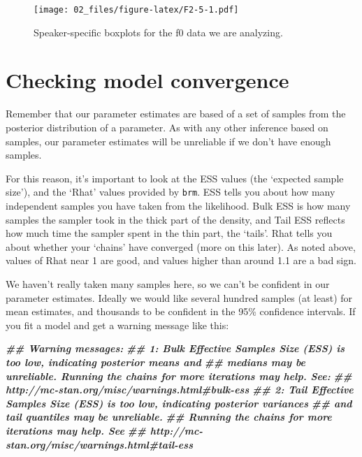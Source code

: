 \documentclass[
]{book}
\newenvironment{Shaded}{\begin{snugshade}}{\end{snugshade}}
\newcommand{\DocumentationTok}[1]{\textcolor[rgb]{0.56,0.35,0.01}{\textbf{\textit{#1}}}}
\begin{document}
\begin{figure}
\centering
\texttt{[image: 02\_files/figure-latex/F2-5-1.pdf]}
\caption{\label{fig:F2-5}Speaker-specific boxplots for the f0 data we are analyzing.}
\end{figure}

\hypertarget{checking-model-convergence}{%
\section{Checking model convergence}\label{checking-model-convergence}}

Remember that our parameter estimates are based of a set of samples from the posterior distribution of a parameter. As with any other inference based on samples, our parameter estimates will be unreliable if we don't have enough samples.

For this reason, it's important to look at the ESS values (the `expected sample size'), and the `Rhat' values provided by \texttt{brm}. ESS tells you about how many independent samples you have taken from the likelihood. Bulk ESS is how many samples the sampler took in the thick part of the density, and Tail ESS reflects how much time the sampler spent in the thin part, the `tails'. Rhat tells you about whether your `chains' have converged (more on this later). As noted above, values of Rhat near 1 are good, and values higher than around 1.1 are a bad sign.

We haven't really taken many samples here, so we can't be confident in our parameter estimates. Ideally we would like several hundred samples (at least) for mean estimates, and thousands to be confident in the 95\% confidence intervals. If you fit a model and get a warning message like this:

\begin{Shaded}
\begin{Highlighting}[]
\DocumentationTok{\#\# Warning messages:}
\DocumentationTok{\#\# 1: Bulk Effective Samples Size (ESS) is too low, indicating posterior means and  }
\DocumentationTok{\#\# medians may be unreliable. Running the chains for more iterations may help. See:}
\DocumentationTok{\#\# http://mc{-}stan.org/misc/warnings.html\#bulk{-}ess}
\DocumentationTok{\#\# 2: Tail Effective Samples Size (ESS) is too low, indicating posterior variances }
\DocumentationTok{\#\# and tail quantiles may be unreliable.}
\DocumentationTok{\#\# Running the chains for more iterations may help. See}
\DocumentationTok{\#\# http://mc{-}stan.org/misc/warnings.html\#tail{-}ess}
\end{Highlighting}
\end{Shaded}
\end{document}
